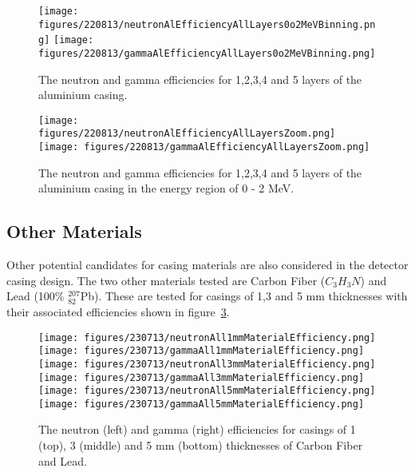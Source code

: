 \documentclass{article}
\begin{document}
\begin{figure}[htbp]
\begin{center}
\texttt{[image: figures/220813/neutronAlEfficiencyAllLayers0o2MeVBinning.png]}
\texttt{[image: figures/220813/gammaAlEfficiencyAllLayers0o2MeVBinning.png]}
\caption{The neutron and gamma efficiencies for 1,2,3,4 and 5 layers of the aluminium casing.}
\label{fig:efficienciesAlLayers}
\end{center}
\end{figure}

\begin{figure}[htbp]
\begin{center}
\texttt{[image: figures/220813/neutronAlEfficiencyAllLayersZoom.png]}
\texttt{[image: figures/220813/gammaAlEfficiencyAllLayersZoom.png]}
\caption{The neutron and gamma efficiencies for 1,2,3,4 and 5 layers of the aluminium casing in the energy region of 0 - 2 MeV.}
\label{fig:efficienciesAlLayersZoom}
\end{center}
\end{figure}

\subsection{Other Materials}
Other potential candidates for casing materials are also considered in the detector casing design. The two other materials tested are Carbon Fiber ($C_{3}H_{3}N$) and Lead (100\% $^{207}_{82}$Pb). These are tested for casings of 1,3 and 5 mm thicknesses with their associated efficiencies shown in figure~\ref{fig:efficienciesMaterial}. 

\begin{figure}[htbp]
\begin{center}
\texttt{[image: figures/230713/neutronAll1mmMaterialEfficiency.png]}
\texttt{[image: figures/230713/gammaAll1mmMaterialEfficiency.png]}
\texttt{[image: figures/230713/neutronAll3mmMaterialEfficiency.png]}
\texttt{[image: figures/230713/gammaAll3mmMaterialEfficiency.png]}
\texttt{[image: figures/230713/neutronAll5mmMaterialEfficiency.png]}
\texttt{[image: figures/230713/gammaAll5mmMaterialEfficiency.png]}
\caption{The neutron (left) and gamma (right) efficiencies for casings of 1 (top), 3 (middle) and 5 mm (bottom) thicknesses of Carbon Fiber and Lead.}
\label{fig:efficienciesMaterial}
\end{center}
\end{figure}
\end{document}
